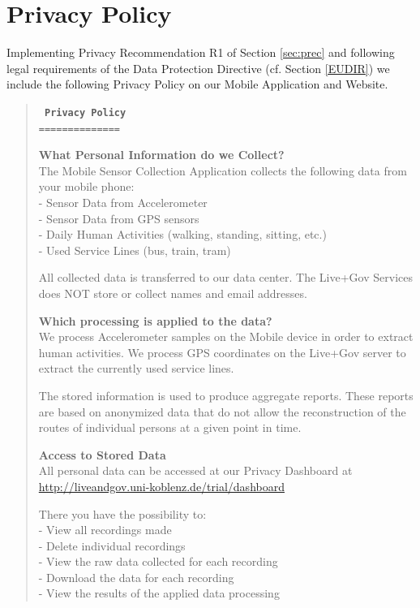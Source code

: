 \section{Privacy Policy} \label{sec:PP}
Implementing Privacy Recommendation R1 of Section \ref{sec:prec} and
following legal requirements of the Data Protection Directive
(cf. Section \ref{EUDIR}) we include the following Privacy Policy on
our Mobile Application and Website.

\begin{quote}
\tt \small
\textbf{Privacy Policy}\\
==============

\textbf{What Personal Information do we Collect?}\\
The Mobile Sensor Collection Application collects the following data from your mobile phone:\\
- Sensor Data from Accelerometer\\
- Sensor Data from GPS sensors\\
- Daily Human Activities (walking, standing, sitting, etc.)\\
- Used Service Lines (bus, train, tram)

All collected data is transferred to our data center. The Live+Gov
Services does NOT store or collect names and email addresses.

\textbf{Which processing is applied to the data?}\\
We process Accelerometer samples on the Mobile device in order to extract human activities.
We process GPS coordinates on the Live+Gov server to extract the currently used service lines.

The stored information is used to produce aggregate reports.
These reports are based on anonymized data that do not allow the reconstruction of the routes of individual persons at a given point in time.

\textbf{Access to Stored Data}\\
All personal data can be accessed at our Privacy Dashboard at
\url{http://liveandgov.uni-koblenz.de/trial/dashboard}

There you have the possibility to:\\
- View all recordings made\\
- Delete individual recordings\\
- View the raw data collected for each recording\\
- Download the data for each recording\\
- View the results of the applied data processing


\end{quote}
